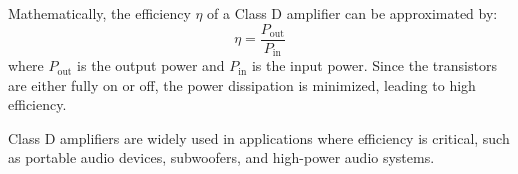 Mathematically, the efficiency \(\eta\) of a Class D amplifier can be approximated by:
\[
\eta = \frac{P_{\text{out}}}{P_{\text{in}}}
\]
where \(P_{\text{out}}\) is the output power and \(P_{\text{in}}\) is the input power. Since the transistors are either fully on or off, the power dissipation is minimized, leading to high efficiency.

Class D amplifiers are widely used in applications where efficiency is critical, such as portable audio devices, subwoofers, and high-power audio systems.

